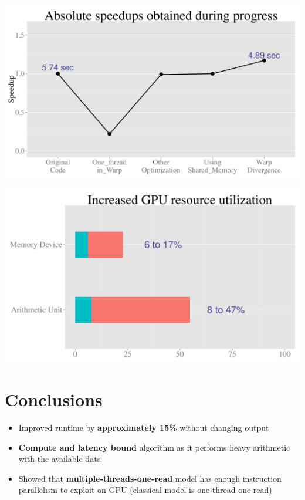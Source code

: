 \documentclass[a0,portrait]{a0poster}
\begin{document}
\begin{multicols}{2}
\begin{minipage}{.235\textwidth}
\includegraphics[width=\textwidth]{speedup.pdf}
\end{minipage}
\begin{minipage}{0.235\textwidth}
\includegraphics[width=\textwidth]{util.pdf}
\end{minipage}
\vspace{1cm}



\color{DarkRed} 
\section*{Conclusions}
\color{Black} 


\begin{itemize}
\item Improved runtime by \textbf{approximately 15\%} without changing output
\item \textbf{Compute and latency bound} algorithm as it performs heavy arithmetic with the available data
\item Showed that \textbf{multiple-threads-one-read} model has enough instruction parallelism to exploit on GPU (classical model is one-thread one-read)
\end{itemize}


\end{multicols}
\end{document}
